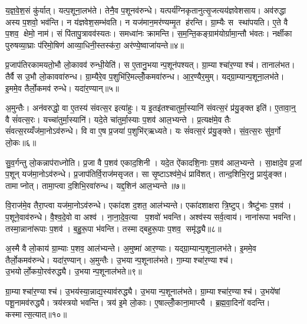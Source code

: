 य॒ज्ञ॒वे॒श॒सं कु॑र्यात्। यत्प॒शूना॒लभ॑ते। तेनै॒व प॒शूनव॑रुन्धे। यत्पर्य॑ग्निकृतानुत्सृ॒जत्यय॑ज्ञवेशसाय। अव॑रुद्धा अस्य प॒शवो॒ भव॑न्ति। न य॑ज्ञवेश॒सम्भ॑वति। न यज॑मान॒मर॑ण्यम्मृ॒त ह॑रन्ति। ग्रा॒म्यैः स स्था॑पयति। ए॒ते वै प॒शव॒ क्षेमो॒ नाम॑। सं पि॑तापु॒त्रावव॑स्यतः। समध्वा॑नः क्रामन्ति। स॒म॒न्ति॒कङ्ग्राम॑योर्ग्रामा॒न्तौ भ॑वतः। नर्क्षीका पुरुषव्या॒घ्राः प॑रिमो॒षिण॑ आव्या॒धिनी॒स्तस्क॑रा॒ अर॑ण्ये॒ष्वाजा॑यन्ते॥४॥\anuvakamend[ऋ॒तव॑ स्यातामुत्सृ॒जेत्स्य॑त॒स्त्रीणि॑ च]

प्र॒जाप॑तिरकामयतो॒भौ लो॒कावव॑ रुन्धी॒येति॑। स ए॒तानु॒भयान्प॒शून॑पश्यत्। ग्रा॒म्याश्चा॑र॒ण्याश्च॑। तानाल॑भत। तैर्वै स उ॒भौ लो॒काववा॑रुन्ध। ग्रा॒म्यैरे॒व प॒शुभि॑रि॒मल्लोँ॒कमवा॑रुन्ध। आ॒र॒ण्यैर॒मुम्। यद्ग्रा॒म्यान्प॒शूना॒लभ॑ते। इ॒ममे॒व तैर्लो॒कमव॑ रुन्धे। यदा॑र॒ण्यान्॥५॥

अ॒मुन्तैः। अन॑वरुद्धो॒ वा ए॒तस्य॑ संवत्स॒र इत्या॑हुः। य इ॒तइ॑तश्चातुर्मा॒स्यानि॑ संवत्स॒रं प्र॑यु॒ङ्क्त इति॑। ए॒तावा॒न्॒ वै सं॑वत्स॒रः। यच्चा॑तुर्मा॒स्यानि॑। यदे॒ते चा॑तुर्मा॒स्याः प॒शव॑ आल॒भ्यन्ते। प्र॒त्यक्ष॑मे॒व तैः सं॑वत्स॒रय्यँज॑मा॒नोऽव॑रुन्धे। वि वा ए॒ष प्र॒जया॑ प॒शुभि॑र्‌ऋध्यते। यः सं॑वत्स॒रं प्र॑यु॒ङ्क्ते। सं॒व॒त्स॒रः सु॑व॒र्गो लो॒कः॥६॥

सु॒व॒र्गन्तु लो॒कन्नाप॑राध्नोति। प्र॒जा वै प॒शव॑ एकाद॒शिनी। यदे॒त ऐ॑कादशि॒नाः प॒शव॑ आल॒भ्यन्ते। सा॒क्षादे॒व प्र॒जां प॒शून् यज॑मा॒नोऽव॑रुन्धे। प्र॒जाप॑तिर्वि॒राज॑मसृजत। सा सृ॒ष्टाऽश्व॑मे॒धं प्रावि॑शत्। तान्द॒शिभि॒रनु॒ प्रायु॑ङ्क्त। तामाप्नोत्। तामा॒प्त्वा द॒शिभि॒रवा॑रुन्ध। यद्द॒शिन॑ आल॒भ्यन्ते॥७॥

वि॒राज॑मे॒व तैरा॒प्त्वा यज॑मा॒नोऽव॑रुन्धे। एका॑दश द॒शत॒ आल॑भ्यन्ते। एका॑दशाक्षरा त्रि॒ष्टुप्। त्रैष्टु॑भाः प॒शव॑। प॒शूने॒वाव॑रुन्धे। वै॒श्व॒दे॒वो वा अश्व॑। ना॒ना॒दे॒व॒त्या प॒शवो॑ भवन्ति। अश्व॑स्य सर्व॒त्वाय॑। नाना॑रूपा भवन्ति। तस्मा॒न्नाना॑रूपाः प॒शव॑। ब॒हु॒रू॒पा भ॑वन्ति। तस्माद्बहुरू॒पाः प॒शव॒ समृ॑द्ध्यै॥८॥\anuvakamend[आ॒र॒ण्याल्लोँ॒को द॒शिन॑ आल॒भ्यन्ते॒ नाना॑रूपाः प॒शवो॒ द्वे च॑]

अ॒स्मै वै लो॒काय॑ ग्रा॒म्याः प॒शव॒ आल॑भ्यन्ते। अ॒मुष्मा॑ आर॒ण्याः। यद्ग्रा॒म्यान्प॒शूना॒लभ॑ते। इ॒ममे॒व तैर्लो॒कमव॑रुन्धे। यदा॑र॒ण्यान्। अ॒मुन्तैः। उ॒भयान्प॒शूनाल॑भते। गा॒म्याश्चा॑र॒ण्याश्च॑। उ॒भयोर्लो॒कयो॒रव॑रुद्ध्यै। उ॒भयान्प॒शूनाल॑भते॥९॥

ग्रा॒म्याश्चा॑र॒ण्याश्च॑। उ॒भय॑स्या॒न्नाद्य॒स्याव॑रुद्ध्यै। उ॒भयान्प॒शूनाल॑भते। ग्रा॒म्याश्चा॑र॒ण्याश्च॑। उ॒भये॑षां पशू॒नामव॑रुद्ध्यै। त्रय॑स्त्रयो भवन्ति। त्रय॑ इ॒मे लो॒काः। ए॒षाल्लोँ॒काना॒माप्त्यै। ब्र॒ह्म॒वा॒दिनो॑ वदन्ति। कस्मात्स॒त्यात्॥१०॥

